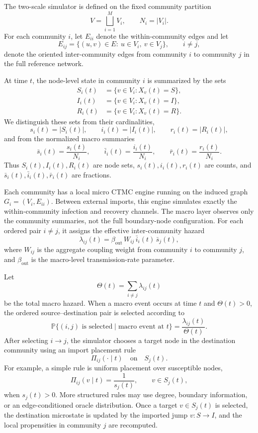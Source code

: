 \documentclass[a4paper,fleqn]{cas-sc}
\begin{document}
The two-scale simulator is defined on the fixed community partition
\[
V=\bigsqcup_{i=1}^{M}V_i,
\qquad N_i=|V_i|.
\]
For each community \(i\), let \(E_{ii}\) denote the within-community edges and let
\[
E_{ij}=\{(u,v)\in E:\ u\in V_i,\ v\in V_j\},
\qquad i\neq j,
\]
denote the oriented inter-community edges from community \(i\) to community \(j\) in the full reference network.

At time \(t\), the node-level state in community \(i\) is summarized by the sets
\[
\begin{aligned}
S_i(t) &= \{v\in V_i : X_v(t)=S\},\\
I_i(t) &= \{v\in V_i : X_v(t)=I\},\\
R_i(t) &= \{v\in V_i : X_v(t)=R\}.
\end{aligned}
\]
We distinguish these sets from their cardinalities,
\[
s_i(t)=|S_i(t)|,\qquad i_i(t)=|I_i(t)|,\qquad r_i(t)=|R_i(t)|,
\]
and from the normalized macro summaries
\[
\bar{s}_i(t)=\frac{s_i(t)}{N_i},\qquad
\bar{i}_i(t)=\frac{i_i(t)}{N_i},\qquad
\bar{r}_i(t)=\frac{r_i(t)}{N_i}.
\]
Thus \(S_i(t),I_i(t),R_i(t)\) are node sets, \(s_i(t),i_i(t),r_i(t)\) are counts, and \(\bar{s}_i(t),\bar{i}_i(t),\bar{r}_i(t)\) are fractions.

Each community has a local micro CTMC engine running on the induced graph \(G_i=(V_i,E_{ii})\). Between external imports, this engine simulates exactly the within-community infection and recovery channels. The macro layer observes only the community summaries, not the full boundary-node configuration. For each ordered pair \(i\neq j\), it assigns the effective inter-community hazard
\[
\lambda_{ij}(t)
=\beta_{\mathrm{out}}\,W_{ij}\,\bar{i}_i(t)\,\bar{s}_j(t),
\]
where \(W_{ij}\) is the aggregate coupling weight from community \(i\) to community \(j\), and \(\beta_{\mathrm{out}}\) is the macro-level transmission-rate parameter.

Let
\[
\Theta(t)=\sum_{i\neq j}\lambda_{ij}(t)
\]
be the total macro hazard. When a macro event occurs at time \(t\) and \(\Theta(t)>0\), the ordered source--destination pair is selected according to
\[
\mathbb P\{(i,j)\text{ is selected}\mid\text{macro event at }t\}
=\frac{\lambda_{ij}(t)}{\Theta(t)}.
\]
After selecting \(i\to j\), the simulator chooses a target node in the destination community using an import placement rule
\[
\Pi_{ij}(\cdot\mid t)
\quad\text{on}\quad S_j(t).
\]
For example, a simple rule is uniform placement over susceptible nodes,
\[
\Pi_{ij}(v\mid t)=\frac{1}{s_j(t)},\qquad v\in S_j(t),
\]
when \(s_j(t)>0\). More structured rules may use degree, boundary information, or an edge-conditioned oracle distribution. Once a target \(v\in S_j(t)\) is selected, the destination microstate is updated by the imported jump \(v:S\to I\), and the local propensities in community \(j\) are recomputed.
\end{document}
